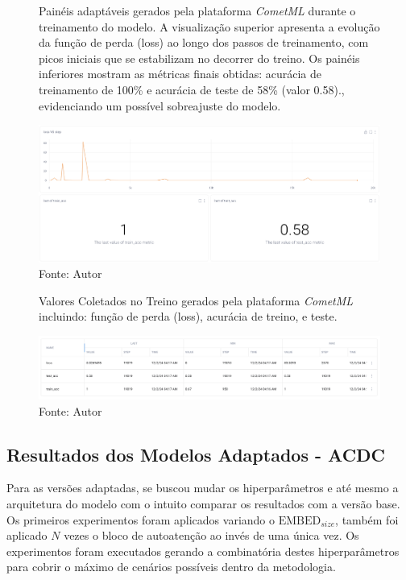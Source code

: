 \begin{figure}[h!]
    \centering
    \captionsetup{width=0.98\textwidth, justification=justified}
    \caption{Painéis adaptáveis gerados pela plataforma \textit{CometML} durante o treinamento do modelo. A visualização superior apresenta a evolução da função de perda (loss) ao longo dos passos de treinamento, com picos iniciais que se estabilizam no decorrer do treino. Os painéis inferiores mostram as métricas finais obtidas: acurácia de treinamento de 100\% e acurácia de teste de 58\% (valor 0.58)., evidenciando um possível sobreajuste do modelo.  
    }
    \includegraphics[width=1\textwidth]{figures/fig028.png}
    \caption*{Fonte: Autor}
    \label{fig:fig028}
\end{figure}


\begin{figure}[h!]
    \centering
    \captionsetup{width=0.98\textwidth, justification=justified}
    \caption{Valores Coletados no Treino gerados pela plataforma \textit{CometML} incluindo: função de perda (loss), acurácia de treino, e teste.}
    \includegraphics[width=1\textwidth]{figures/fig029.png}
    \caption*{Fonte: Autor}
    \label{fig:fig029}
\end{figure}


\subsection{Resultados dos Modelos Adaptados - ACDC}
\label{subsec:resultados_acdc_adaptado}

Para as versões adaptadas, se buscou mudar os hiperparâmetros e até mesmo a arquitetura do modelo com o intuito comparar os resultados com a versão base. Os primeiros experimentos foram aplicados variando o $\text{EMBED}_{size}$, também foi aplicado $N$ vezes o bloco de autoatenção ao invés de uma única vez. Os experimentos foram executados gerando a combinatória destes hiperparâmetros para cobrir o máximo de cenários possíveis dentro da metodologia.

